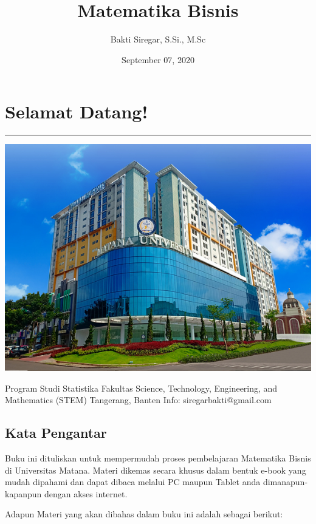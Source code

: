 \documentclass[
]{book}
\title{Matematika Bisnis}
\author{Bakti Siregar, S.Si., M.Sc}
\date{September 07, 2020}
\begin{document}
\maketitle

{
\setcounter{tocdepth}{1}
\tableofcontents
}
\hypertarget{selamat-datang}{%
\chapter*{Selamat Datang!}\label{selamat-datang}}

\begin{center}\rule{0.5\linewidth}{0.5pt}\end{center}

\begin{center}\includegraphics[width=0.5\linewidth]{images/cover} \end{center}

Program Studi Statistika
Fakultas Science, Technology, Engineering, and Mathematics (STEM)
Tangerang, Banten
Info: siregarbakti@gmail.com

\hypertarget{kata-pengantar}{%
\section*{Kata Pengantar}\label{kata-pengantar}}

Buku ini dituliskan untuk mempermudah proses pembelajaran Matematika Bisnis di Universitas Matana. Materi dikemas secara khusus dalam bentuk e-book yang mudah dipahami dan dapat dibaca melalui PC maupun Tablet anda dimanapun-kapanpun dengan akses internet.

Adapun Materi yang akan dibahas dalam buku ini adalah sebagai berikut:
\end{document}
